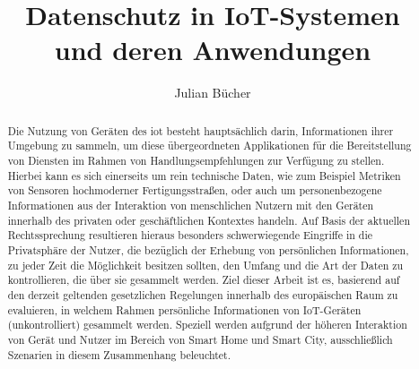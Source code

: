 \documentclass[runningheads]{llncs}
\begin{document}

\title{Datenschutz in IoT-Systemen \\und deren Anwendungen}
%
%
\author{Julian Bücher}
%
%
%
\maketitle              %


\begin{abstract}
Die Nutzung von Geräten des \ac{iot} besteht hauptsächlich darin, Informationen ihrer Umgebung zu sammeln, um diese übergeordneten Applikationen für die Bereitstellung von Diensten im Rahmen von Handlungsempfehlungen zur Verfügung zu stellen. Hierbei kann es sich einerseits um rein technische Daten, wie zum Beispiel Metriken von Sensoren hochmoderner Fertigungsstraßen, oder auch um personenbezogene Informationen aus der Interaktion von menschlichen Nutzern mit den Geräten innerhalb des privaten oder geschäftlichen Kontextes handeln. Auf Basis der aktuellen Rechtssprechung resultieren hieraus besonders schwerwiegende Eingriffe in die Privatsphäre der Nutzer, die bezüglich der Erhebung von persönlichen Informationen, zu jeder Zeit die Möglichkeit besitzen sollten, den Umfang und die Art der Daten zu kontrollieren, die über sie gesammelt werden. Ziel dieser Arbeit ist es, basierend auf den derzeit geltenden gesetzlichen Regelungen innerhalb des europäischen Raum zu evaluieren, in welchem Rahmen persönliche Informationen von IoT-Geräten (unkontrolliert) gesammelt werden. Speziell werden aufgrund der höheren Interaktion von Gerät und Nutzer im Bereich von Smart Home und Smart City, ausschließlich Szenarien in diesem Zusammenhang beleuchtet.

\end{abstract}
\end{document}
